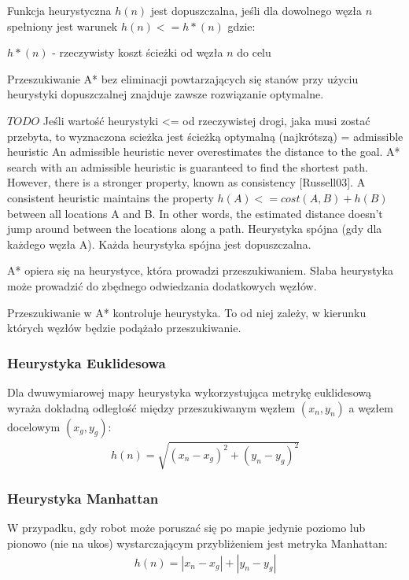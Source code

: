 Funkcja heurystyczna $h(n)$ jest dopuszczalna, jeśli dla dowolnego węzła $n$ spełniony jest warunek $h(n) <= h*(n)$
 gdzie:

 $h*(n)$ - rzeczywisty koszt ścieżki od węzła $n$ do celu

Przeszukiwanie A* bez eliminacji powtarzających się stanów przy użyciu heurystyki dopuszczalnej znajduje zawsze rozwiązanie optymalne.

$TODO$ Jeśli wartość heurystyki <= od rzeczywistej drogi, jaka musi zostać przebyta, to wyznaczona scieżka jest ścieżką optymalną (najkrótszą)
= admissible heuristic
An admissible heuristic never overestimates the distance to the goal. A* search with an
admissible heuristic is guaranteed to find the shortest path. However, there is a stronger
property, known as consistency [Russell03]. A consistent heuristic maintains the property
$h(A) <= cost(A, B) + h(B)$ between all locations A and B. In other words, the estimated
distance doesn’t jump around between the locations along a path. \cite{cooppath}
Heurystyka spójna (gdy dla każdego węzła A).
Każda heurystyka spójna jest dopuszczalna.

A* opiera się na heurystyce, która prowadzi przeszukiwaniem. Słaba heurystyka może prowadzić do zbędnego odwiedzania dodatkowych węzłów.

Przeszukiwanie w A* kontroluje heurystyka. To od niej zależy, w kierunku których węzłów będzie podążało przeszukiwanie.

\subsubsection{Heurystyka Euklidesowa}
Dla dwuwymiarowej mapy heurystyka wykorzystująca metrykę euklidesową wyraża dokładną odległość między przeszukiwanym węzłem $(x_n, y_n)$ a węzłem docelowym $(x_g, y_g)$:
\begin{gather}
 	h(n) = \sqrt{(x_n - x_g)^2 + (y_n - y_g)^2}
 	\label{eq_astar_heu_euc} 
\end{gather}

\subsubsection{Heurystyka Manhattan}
W przypadku, gdy robot może poruszać się po mapie jedynie poziomo lub pionowo (nie na ukos) wystarczającym przybliżeniem jest metryka Manhattan:
\begin{gather}
 	h(n) = |x_n - x_g| + |y_n - y_g|
 	\label{eq_astar_heu_man} 
\end{gather}

